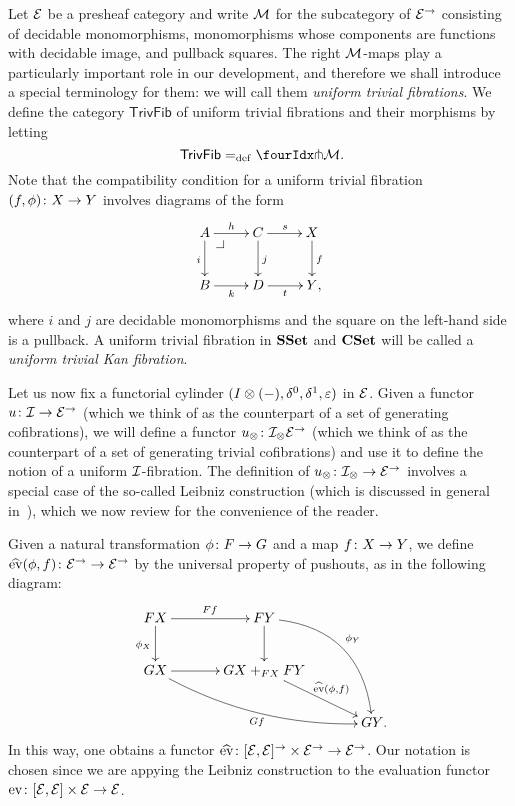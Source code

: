 \documentclass[reqno,10pt,a4paper,oneside]{amsart}
\begin{document}
\begin{example} \label{exa-triv-kan-fib}
Let $\catE$ be a presheaf category and write $\cal{M}$ for the subcategory of $\cal{E}^\to$ consisting of decidable monomorphisms, \ie monomorphisms whose components are functions with decidable image, and pullback squares.
The right $\cal{M}$-maps play a particularly important role in our development, and therefore we shall introduce a special terminology for them: we will call them \emph{uniform trivial fibrations}.
We define the category $\mathsf{TrivFib}$ of uniform trivial fibrations and their morphisms by letting
\[
 \mathsf{TrivFib} \defeq \liftr{\cal{M}} \rlap{.}
\]
Note that the compatibility condition for a uniform trivial fibration $(f, \phi) \co X \to Y$ involves diagrams of the form
\[
\xymatrix{
A \ar[r]^{h} \ar[d]_{i} \pullback{dr} & C \ar[d]^{j} \ar[r]^s & X \ar[d]^f \\
B \ar[r]_{k} & D \ar[r]_t & Y \rlap{,}}
\]
where $i$ and $j$ are decidable monomorphisms and the square on the left-hand side is a pullback.
A uniform trivial fibration in $\SSet$ and $\CSet$ will be called a \emph{uniform trivial Kan fibration}.
\end{example}

Let us now fix a functorial cylinder $(\interval \otimes (-), \lcyl, \rcyl, \ccyl)$ in $\calE$.
Given a functor $u \co \cal{I} \to \cal{E}^\to$ (which we think of as the counterpart of a set of generating cofibrations), we will define a functor $u_\otimes \co \cal{I}_\otimes \cal{E}^\to$ (which we think of as the counterpart of a set of generating trivial cofibrations) and use it to define the notion of a uniform $\cal{I}$-fibration.
The definition of $u_\otimes \co \cal{I}_\otimes \to \cal{E}^\to$ involves a special case of the so-called Leibniz construction (which is discussed in general in~\cite{riehl-verity:reedy}), which we now review for the convenience of the reader.

Given a natural transformation $\phi \co F \to G$ and a map $f \co X \to Y$, we define $\widehat{\mathrm{ev}}(\phi, f) \co \catE^\to \to \catE^\to$ by the universal property of pushouts, as in the following diagram:
\begin{gather*}
\xymatrix@C=1.2cm{
  FX \ar[r]^{Ff} \ar[d]_{\phi_X} & FY \ar@/^2pc/[ddr]^{\phi_Y} \ar[d] & \\
  GX \ar@/_1pc/[drr]_{Gf} \ar[r] & GX +_{FX} FY  \ar[dr]^-{\widehat{\mathrm{ev}}(\phi, f)} & \\
  & & GY
\rlap{.}}
\end{gather*}
In this way, one obtains a functor $\widehat{\mathrm{ev}} \co [\cal{E}, \cal{E}]^\to \times \cal{E}^\to \to \cal{E}^\to$.
Our notation is chosen since we are appying the Leibniz construction to the evaluation functor $\mathrm{ev} \co [\cal{E},\cal{E}] \times \calE \to \cal{E}$.
\end{document}
